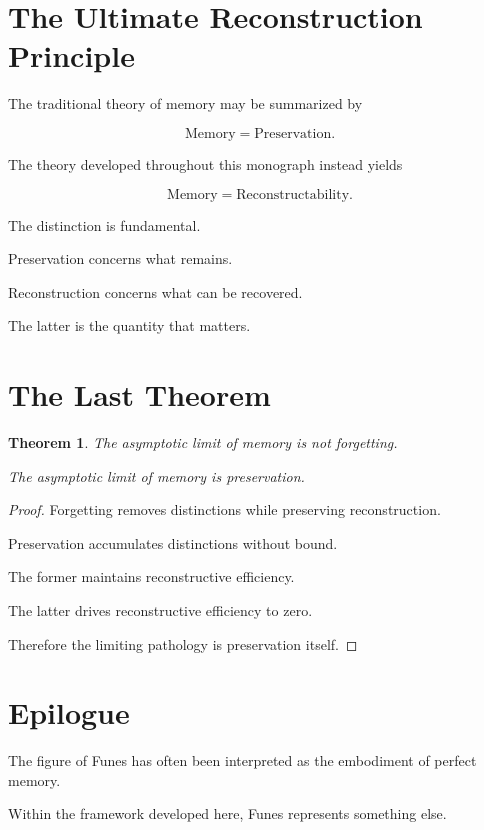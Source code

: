 \documentclass[12pt,oneside]{book}
\theoremstyle{plain} \newtheorem{theorem}{Theorem}[chapter] \newtheorem{lemma}[theorem]{Lemma} \newtheorem{proposition}[theorem]{Proposition} \newtheorem{corollary}[theorem]{Corollary}
\theoremstyle{definition} \newtheorem{definition}[theorem]{Definition} \newtheorem{axiom}[theorem]{Axiom} \newtheorem{construction}[theorem]{Construction}
\theoremstyle{remark} \newtheorem{remark}[theorem]{Remark} \newtheorem{example}[theorem]{Example}
\begin{document}
\section{The Ultimate Reconstruction Principle}

The traditional theory of memory may be summarized by

\[
\text{Memory}
=
\text{Preservation}.
\]

The theory developed throughout this monograph instead yields

\[
\text{Memory}
=
\text{Reconstructability}.
\]

The distinction is fundamental.

Preservation concerns what remains.

Reconstruction concerns what can be recovered.

The latter is the quantity that matters.

\section{The Last Theorem}

\begin{theorem}

The asymptotic limit of memory is not forgetting.

The asymptotic limit of memory is preservation.

\end{theorem}

\begin{proof}

Forgetting removes distinctions while preserving reconstruction.

Preservation accumulates distinctions without bound.

The former maintains reconstructive efficiency.

The latter drives reconstructive efficiency to zero.

Therefore the limiting pathology is preservation itself.

\end{proof}

\section{Epilogue}

The figure of Funes has often been interpreted as the embodiment of perfect memory.

Within the framework developed here, Funes represents something else.
\end{document}
